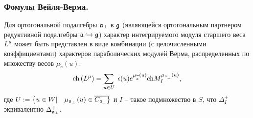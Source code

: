 \subsubsection{Фомулы Вейля-Верма.}

\begin{statement}
Для ортогональной подалгебры  $\frak{a}_{\perp }$ в $\frak{g}$ (являющейся ортогональным партнером редуктивной подалгебры $\frak{a}\hookrightarrow \frak{g}$) характер интегрируемого модуля старшего веса  $L^{\mu }$ может быть представлен в виде комбинации (с целочисленными коэффициентами) характеров параболических модулей Верма, распределенных по множеству весов $\mu _{\widetilde{\mathfrak{a}}}\left(
u\right)$:
\begin{equation}
\mathrm{ch}\left( L^{\mu }\right) =\sum_{u\in U}\;\epsilon (u)e^{\mu _{%
\widetilde{\frak{a}}}\left( u\right) }\mathrm{ch}M_{I}^{\mu _{\frak{a}%
_{\perp }}\left( u\right) },  \label{gen Weyl-Verma}
\end{equation}
где  $U:=\left\{ u\in W|\quad \mu _{\frak{a}_{\perp }}\left( u\right) \in
\overline{C_{\frak{a}_{\perp }}}\right\} $ и $I$ -- такое подмножество в  $S$, что $\Delta _{I}^{+}$ эквивалентно $\Delta _{\frak{a}_{\perp }}^{+}$.
\end{statement}

